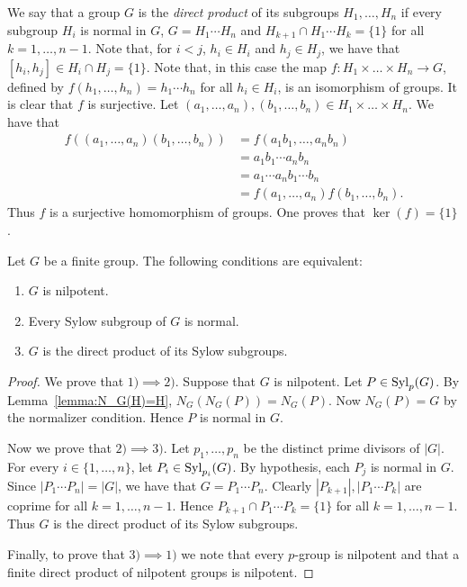 We say that a group $G$ is the {\em direct product} of its subgroups $H_1,\dots ,H_n$ if every subgroup $H_i$ is normal in $G$, $G=H_1\cdots H_n$ and
$H_{k+1}\cap H_1\cdots H_{k}=\{ 1\}$ for all $k=1,\dots, n-1$. Note that, for $i<j$, $h_i\in H_i$ and $h_j\in H_j$, we have that $[h_i,h_j]\in H_i\cap H_j=\{ 1\}$. Note that, in this case the map $f\colon H_1\times\dots\times H_n\rightarrow G$, defined by $f(h_1,\dots ,h_n)=h_1\cdots h_n$ for all $h_i\in H_i$, is an isomorphism of groups. It is clear that $f$ is surjective. Let $(a_1,\dots,a_n),(b_1,\dots,b_n)\in H_1\times\dots\times H_n$. We have that
\begin{align*}
f((a_1,\dots,a_n)(b_1,\dots,b_n))&=f(a_1b_1,\dots,a_nb_n)\\
&=a_1b_1\cdots a_nb_n\\
&=a_1\cdots a_nb_1\cdots b_n\\
&=f(a_1,\dots ,a_n)f(b_1,\dots ,b_n).
\end{align*}
Thus $f$ is a surjective homomorphism of groups. One proves that
$\ker(f)=\{ 1\}$. 


\begin{theorem}
	\label{thm:nilpotente:eq}
	Let $G$ be a finite group. The following conditions are equivalent: 
	\begin{enumerate}
		\item $G$ is nilpotent.
		\item Every Sylow subgroup of $G$ is normal.
		\item $G$ is the direct product of its Sylow subgroups. 
	\end{enumerate}
\end{theorem}

\begin{proof}
	We prove that $1)\implies 2)$. Suppose that $G$ is nilpotent. Let $P\in\mathrm{Syl}_p(G)$.  By Lemma~\ref{lemma:N_G(H)=H},  
	$N_G(N_G(P))=N_G(P)$. Now  $N_G(P)=G$ by the normalizer condition. Hence $P$ is normal in $G$.

	Now we prove that $2)\implies 3)$. Let $p_1,\dots,p_n$ be the distinct prime divisors of $|G|$. For every $i\in\{1,\dots,n\}$, let $P_i\in\mathrm{Syl}_{p_i}(G)$.
	By hypothesis, each $P_j$ is normal in $G$. Since $|P_1\cdots P_n|=|G|$, we have that $G=P_1\cdots P_n$. Clearly
	$|P_{k+1}|, |P_1\cdots P_k|$ are coprime for all $k=1,\dots, n-1$. Hence $P_{k+1}\cap P_1\cdots P_k=\{ 1\}$ for all $k=1,\dots, n-1$. Thus $G$ is the direct product of its Sylow subgroups. 

	Finally, to prove that $3)\implies 1)$ we note that every 
	$p$-group is nilpotent and that a finite direct product of nilpotent groups is nilpotent. 
\end{proof}


